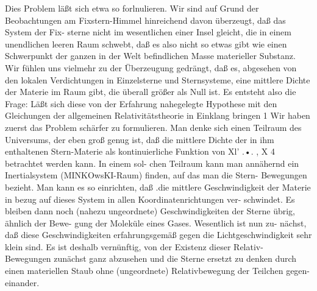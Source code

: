 Dies Problem läßt sich etwa so forlnulieren. Wir sind
auf Grund der Beobachtungen am Fixstern-Himmel
hinreichend davon überzeugt, daß das System der Fix-
sterne nicht im wesentlichen einer Insel gleicht, die in
einem unendlichen leeren Raum schwebt, daß es also
nicht so etwas gibt wie einen Schwerpunkt der ganzen
in der Welt befindlichen Masse materieller Substanz.
Wir fühlen uns vielmehr zu der Überzeugung gedrängt,
daß es, abgesehen von den lokalen Verdichtungen in
Einzelsterne und Sternsysteme, eine mittlere Dichte der
Materie im Raum gibt, die überall größer als Null ist.
Es entsteht also die Frage: Läßt sich diese von der
Erfahrung nahegelegte Hypothese mit den Gleichungen
der allgemeinen Relativitätstheorie in Einklang bringen 1
Wir haben zuerst das Problem schärfer zu formulieren.
Man denke sich einen Teilraum des Universums, der
eben groß genug ist, daß die mittlere Dichte der in ihm
enthaltenen Stern-Materie als kontinuierliche Funktion
von Xl' .•. , X 4 betrachtet werden kann. In einem sol-
chen Teilraum kann man annähernd ein Inertialsystem
(MINKOwsKI-Raum) finden, auf das man die Stern-
Bewegungen bezieht. Man kann es so einrichten, daß
.die mittlere Geschwindigkeit der Materie in bezug auf
dieses System in allen Koordinatenrichtungen ver-
schwindet. Es bleiben dann noch (nahezu ungeordnete)
Geschwindigkeiten der Sterne übrig, ähnlich der Bewe-
gung der Moleküle eines Gases. Wesentlich ist nun zu-
nächst, daß diese Geschwindigkeiten erfahrungsgemäß
gegen die Lichtgeschwindigkeit sehr klein sind. Es ist
deshalb vernünftig, von der Existenz dieser Relativ-
Bewegungen zunächst ganz abzusehen und die Sterne
ersetzt zu denken durch einen materiellen Staub ohne
(ungeordnete) Relativbewegung der Teilchen gegen-
einander.

